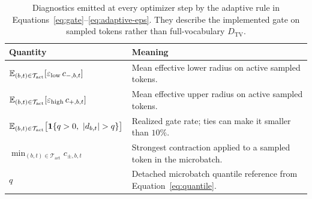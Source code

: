 \begin{table}[h]
\centering
\caption{Diagnostics emitted at every optimizer step by the adaptive rule in Equations~\eqref{eq:gate}--\eqref{eq:adaptive-eps}. They describe the implemented gate on sampled tokens rather than full-vocabulary $D_{\mathrm{TV}}$.}
\label{tab:monitor}
\small
\begin{tabular}{@{}ll@{}}
\toprule
Quantity & Meaning \\
\midrule
$\mathbb{E}_{(b,t)\in\mathcal T_{\mathrm{act}}}[\varepsilon_{\mathrm{low}}\,c_{-,b,t}]$ & Mean effective lower radius on active sampled tokens. \\
$\mathbb{E}_{(b,t)\in\mathcal T_{\mathrm{act}}}[\varepsilon_{\mathrm{high}}\,c_{+,b,t}]$ & Mean effective upper radius on active sampled tokens. \\
$\E_{(b,t)\in\mathcal T_{\mathrm{act}}}\big[\mathbf 1\{q>0,\ |d_{b,t}|>q\}\big]$ & Realized gate rate; ties can make it smaller than $10\%$. \\
$\min_{(b,t)\in\mathcal T_{\mathrm{act}}}c_{\pm,b,t}$ & Strongest contraction applied to a sampled token in the microbatch. \\
$q$ & Detached microbatch quantile reference from Equation~\eqref{eq:quantile}. \\
\bottomrule
\end{tabular}
\end{table}
